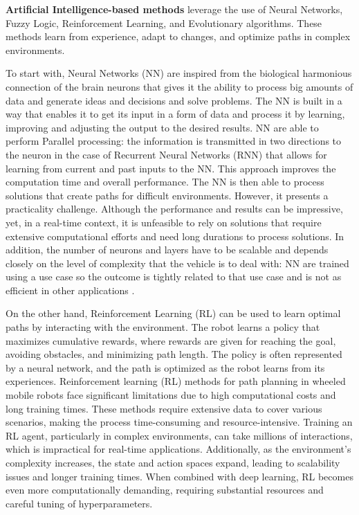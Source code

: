 \textbf{Artificial Intelligence-based methods} 
leverage the use of Neural Networks, Fuzzy Logic, Reinforcement Learning, and Evolutionary algorithms. 
These methods learn from experience, adapt to changes, and optimize paths in complex environments. 


To start with, Neural Networks (NN) are inspired from the biological harmonious connection of the brain neurons
that gives it the ability to process big amounts of data and generate ideas and decisions and solve problems. 
The NN is built in a way that enables it to get its input in a form of data and process it by learning, improving 
and adjusting the output to the desired results. NN are able to perform Parallel processing: the information is 
transmitted in two
directions to the neuron in the case of Recurrent Neural Networks (RNN) that allows for learning from current and 
past inputs to the NN. This approach improves the computation time and overall performance. 
The NN is then able to process solutions that create paths for difficult environments. 
However, it presents a practicality challenge. Although the performance and results can be impressive, yet, in a 
real-time context, 
it is unfeasible to rely on solutions that require extensive computational efforts and need long durations to 
process solutions. In addition, the number of neurons and layers have to be scalable and depends closely on the 
level of complexity that the vehicle is to deal with: NN are trained using a use case so the 
outcome is tightly related to that use case and is not as efficient in other applications \cite{R12}. 

On the other hand, Reinforcement Learning (RL) can be used to learn optimal paths by interacting with the environment. 
The robot learns a policy that maximizes cumulative rewards, where rewards are given for reaching the goal, avoiding 
obstacles, and minimizing path length. The policy is often represented by a neural network, and the path is optimized 
as the robot learns from its experiences. Reinforcement learning (RL) methods for path planning in wheeled mobile robots 
face significant limitations due to high computational costs and long training times. These methods require extensive 
data to cover various scenarios, making the process time-consuming and resource-intensive. Training an RL agent, 
particularly in complex environments, can take millions of interactions, which is impractical for real-time applications. 
Additionally, as the environment's complexity increases, the state and action spaces expand, 
leading to scalability issues and longer training times. When combined with deep learning, RL becomes even more 
computationally demanding, requiring substantial resources and careful tuning of hyperparameters.

